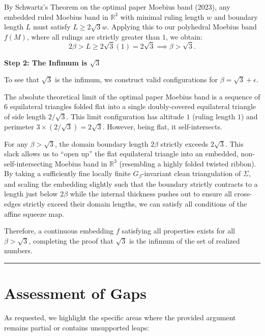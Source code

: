 \documentclass[12pt]{article}
\begin{document}
By Schwartz's Theorem on the optimal paper Moebius band (2023), any embedded ruled Moebius band in $\mathbb{R}^3$ with minimal ruling length $w$ and boundary length $L$ must satisfy $L \ge 2\sqrt{3} w$. 
Applying this to our polyhedral Moebius band $f(M)$, where all rulings are strictly greater than $1$, we obtain:
\[
2\beta > L \ge 2\sqrt{3}(1) = 2\sqrt{3} \implies \beta > \sqrt{3}.
\]

\vspace{1em}

\noindent\textbf{Step 2: The Infimum is $\sqrt{3}$}

\vspace{0.5em}

To see that $\sqrt{3}$ is the infimum, we construct valid configurations for $\beta = \sqrt{3} + \epsilon$.

The absolute theoretical limit of the optimal paper Moebius band is a sequence of $6$ equilateral triangles folded flat into a single doubly-covered equilateral triangle of side length $2/\sqrt{3}$. This limit configuration has altitude $1$ (ruling length $1$) and perimeter $3 \times (2/\sqrt{3}) = 2\sqrt{3}$. However, being flat, it self-intersects.

For any $\beta > \sqrt{3}$, the domain boundary length $2\beta$ strictly exceeds $2\sqrt{3}$. This slack allows us to ``open up'' the flat equilateral triangle into an embedded, non-self-intersecting Moebius band in $\mathbb{R}^3$ (resembling a highly folded twisted ribbon). By taking a sufficiently fine locally finite $G_{\beta}$-invariant clean triangulation of $\Sigma$, and scaling the embedding slightly such that the boundary strictly contracts to a length just below $2\beta$ while the internal thickness pushes out to ensure all cross-edges strictly exceed their domain lengths, we can satisfy all conditions of the affine squeeze map. 

Therefore, a continuous embedding $f$ satisfying all properties exists for all $\beta > \sqrt{3}$, completing the proof that $\sqrt{3}$ is the infimum of the set of realized numbers.

\vspace{2em}
\hrule
\vspace{1em}

\section*{Assessment of Gaps}

As requested, we highlight the specific areas where the provided argument remains partial or contains unsupported leaps:
\end{document}
